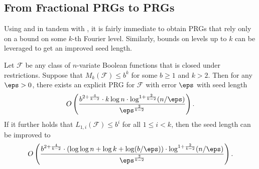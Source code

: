         \subsection{From Fractional PRGs to PRGs}
\label{sec:fprg2prg}
Using  and  in tandem with , it is fairly immediate to obtain PRGs that rely only on a bound on some $k$-th Fourier level.  Similarly, bounds on levels up to $k$ can be leveraged to get an improved seed length.

\begin{THM}
\label{thm:combined}
Let $\mathcal{F}$ be any class of $n$-variate Boolean functions that is closed under restrictions. Suppose that $M_{k}(\mathcal{F})\leq b^{k}$ for some $b\geq 1$ and  $k> 2$. Then for any $\eps>0$, there exists an explicit PRG for $\mathcal{F}$ with error $\eps$ with seed length
\[
    O\left(\frac{b^{2+\frac{4}{k-2}}\cdot k \log n \cdot \log^{1+\frac{2}{k-2}}(n/\eps)}{\eps^{\frac{2}{k-2}}}\right).
\]
If it further holds that $L_{1,i}(\mathcal{F})\leq b^{i}$ for all $1\leq i<k$, then the seed length can be improved to 
\[
    O\left(\frac{b^{2+\frac{4}{k-2}}\cdot (\log\log n +\log k+\log(b/\eps))\cdot \log^{1+\frac{2}{k-2}}(n/\eps)}{\eps^{\frac{2}{k-2}}}\right).
\]
\end{THM}

